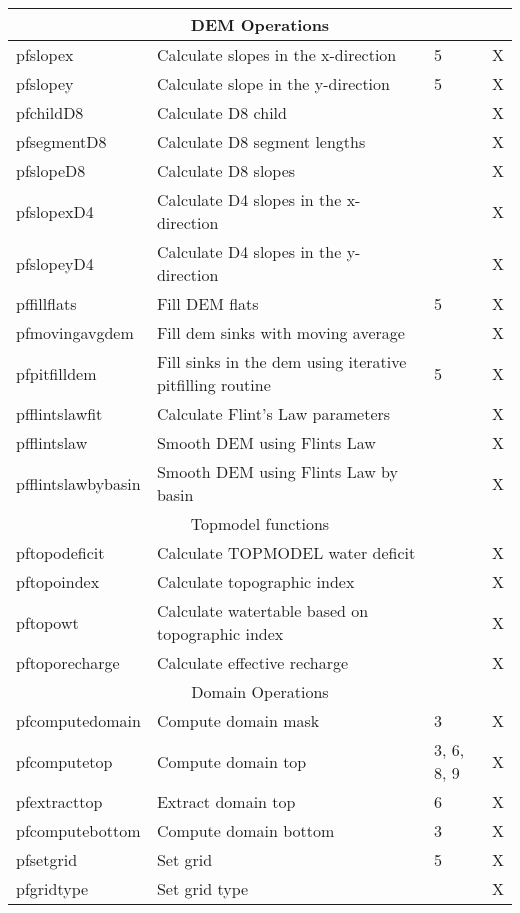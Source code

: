 {\begin{table}
\begin{tabular}{ | p{3cm} | p{6cm} | p{2cm} | p{3cm} | }
\multicolumn{4}{|c|}{DEM Operations}   \\ \hline
	pfslopex & Calculate slopes in the x-direction & 5 & X  \\ \hline
	pfslopey & Calculate slope in the y-direction & 5 & X \\ \hline
	pfchildD8 & Calculate D8 child &  & X \\ \hline
	pfsegmentD8 & Calculate D8 segment lengths &  & X \\ \hline
	pfslopeD8 & Calculate D8 slopes &  & X \\ \hline
	pfslopexD4 & Calculate D4 slopes in the x-direction &  & X \\ \hline
	pfslopeyD4 & Calculate D4 slopes in the y-direction &  & X \\ \hline
	pffillflats & Fill DEM flats & 5 & X \\ \hline
	pfmovingavgdem & Fill dem sinks with moving average &  & X \\ \hline
	pfpitfilldem & Fill sinks in the dem using iterative pitfilling routine & 5 & X \\ \hline
	pfflintslawfit & Calculate Flint's Law parameters &  & X \\ \hline
	pfflintslaw & Smooth DEM using Flints Law &  & X \\ \hline
	pfflintslawbybasin & Smooth DEM using Flints Law by basin &  & X \\ \hline
	\multicolumn{4}{|c|}{Topmodel functions} \\ \hline
	pftopodeficit & Calculate TOPMODEL water deficit &  & X \\ \hline
	pftopoindex & Calculate topographic index &  & X \\ \hline
	pftopowt & Calculate watertable based on topographic index &  & X \\ \hline
	pftoporecharge & Calculate effective recharge &  & X \\ \hline
\multicolumn{4}{|c|}{Domain Operations}  \\ \hline
	pfcomputedomain & Compute domain mask & 3 & X \\ \hline
	pfcomputetop & Compute domain top & 3, 6, 8, 9 & X \\ \hline
	pfextracttop & Extract domain top & 6 & X \\ \hline
	pfcomputebottom & Compute domain bottom & 3 & X \\ \hline
	pfsetgrid & Set grid & 5 & X \\ \hline
	pfgridtype & Set grid type &  & X \\ \hline

\end{tabular}
\end{table}}
